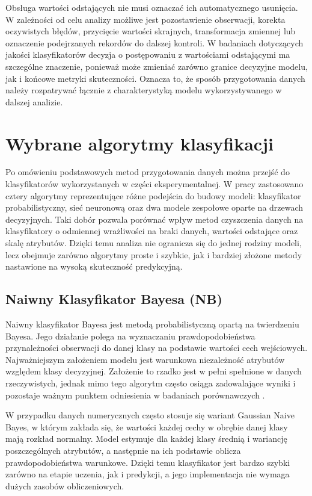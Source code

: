 {Obsługa wartości odstających nie musi oznaczać ich automatycznego usunięcia. W zależności od celu analizy możliwe jest pozostawienie obserwacji, korekta oczywistych błędów, przycięcie wartości skrajnych, transformacja zmiennej lub oznaczenie podejrzanych rekordów do dalszej kontroli. W badaniach dotyczących jakości klasyfikatorów decyzja o postępowaniu z wartościami odstającymi ma szczególne znaczenie, ponieważ może zmieniać zarówno granice decyzyjne modelu, jak i końcowe metryki skuteczności. Oznacza to, że sposób przygotowania danych należy rozpatrywać łącznie z charakterystyką modelu wykorzystywanego w dalszej analizie.
\section{Wybrane algorytmy klasyfikacji}
Po omówieniu podstawowych metod przygotowania danych można przejść do klasyfikatorów wykorzystanych w części eksperymentalnej. W pracy zastosowano cztery algorytmy reprezentujące różne podejścia do budowy modeli: klasyfikator probabilistyczny, sieć neuronową oraz dwa modele zespołowe oparte na drzewach decyzyjnych. Taki dobór pozwala porównać wpływ metod czyszczenia danych na klasyfikatory o odmiennej wrażliwości na braki danych, wartości odstające oraz skalę atrybutów. Dzięki temu analiza nie ogranicza się do jednej rodziny modeli, lecz obejmuje zarówno algorytmy proste i szybkie, jak i bardziej złożone metody nastawione na wysoką skuteczność predykcyjną.

\subsection{Naiwny Klasyfikator Bayesa (NB)}
Naiwny klasyfikator Bayesa jest metodą probabilistyczną opartą na twierdzeniu Bayesa. Jego działanie polega na wyznaczaniu prawdopodobieństwa przynależności obserwacji do danej klasy na podstawie wartości cech wejściowych. Najważniejszym założeniem modelu jest warunkowa niezależność atrybutów względem klasy decyzyjnej. Założenie to rzadko jest w pełni spełnione w danych rzeczywistych, jednak mimo tego algorytm często osiąga zadowalające wyniki i pozostaje ważnym punktem odniesienia w badaniach porównawczych \cite{SklearnGaussianNB}.

W przypadku danych numerycznych często stosuje się wariant Gaussian Naive Bayes, w którym zakłada się, że wartości każdej cechy w obrębie danej klasy mają rozkład normalny. Model estymuje dla każdej klasy średnią i wariancję poszczególnych atrybutów, a następnie na ich podstawie oblicza prawdopodobieństwa warunkowe. Dzięki temu klasyfikator jest bardzo szybki zarówno na etapie uczenia, jak i predykcji, a jego implementacja nie wymaga dużych zasobów obliczeniowych.

}
